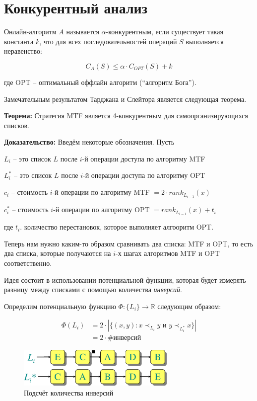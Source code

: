 \documentclass[a4paper,11pt]{article}
\begin{document}
\section{Конкурентный анализ}

Онлайн-алгоритм $A$ называется $\alpha$-конкурентным, если существует такая
константа $k$, что для всех последовательностей операций $S$ выполняется
неравенство:

$$
C_A(S) \leqslant \alpha \cdot C_{OPT}(S) + k
$$

где OPT -- оптимальный оффлайн алгоритм (``алгоритм Бога'').

Замечательным результатом Тарджана и Слейтора является следующая теорема.

\textbf{Теорема:} Стратегия MTF является 4-конкурентным для самоорганизирующихся
списков.

\textbf{Доказательство:} Введём некоторые обозначения. Пусть

$L_i$ -- это список $L$ после $i$-й операции доступа по алгоритму MTF

$L_i^*$ -- это список $L$ после $i$-й операции доступа по алгоритму OPT

$c_i$ -- стоимость $i$-й операции по алгоритму MTF $=2 \cdot rank_{L_{i-1}}(x) $

$c_i^*$ -- стоимость $i$-й операции по алгоритму OPT $= rank_{L_{i-1}}(x) + t_i$

где $t_i$. количество перестановок, которое выполняет алгооритм OPT.

Теперь нам нужно каким-то образом сравнивать два списка: MTF и OPT, то есть два
списка, которые получаются на $i$-х шагах алгоритмов MTF и OPT соответственно.

Идея состоит в использовании потенциальной функции, которая будет измерять
разницу между списками с помощью количества \emph{инверсий}.

Определим потенциальную функцию $\Phi \colon \lbrace L_i \rbrace \to \mathbb{R}$
следующим образом:

\begin{align*}
\Phi(L_i) &= 2 \cdot
   | \{ (x, y) \colon x \prec_{L_i} y \text{ и } y \prec_{L_i^*} x \} | \\
          &= 2 \cdot \# \text{инверсий}
\end{align*}

\begin{figure}[ht]
  \centering
  \includegraphics[width=3in]{lecture14/inversions.eps}
  \caption{Подсчёт количества инверсий}
  \label{fig:inversions}
\end{figure}
\end{document}
